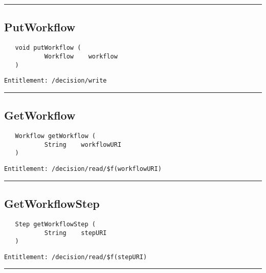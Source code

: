 \rule{12cm}{2pt}
\subsection{PutWorkflow}
\label{Api:PutWorkflow}
\begin{Verbatim}
   void putWorkflow (
           Workflow    workflow
   )
\end{Verbatim}
\begin{Verbatim}[formatcom=\color{Maroon}]
  Entitlement: /decision/write
\end{Verbatim}



\rule{12cm}{2pt}
\subsection{GetWorkflow}
\label{Api:GetWorkflow}
\begin{Verbatim}
   Workflow getWorkflow (
           String    workflowURI
   )
\end{Verbatim}
\begin{Verbatim}[formatcom=\color{Maroon}]
  Entitlement: /decision/read/$f(workflowURI)
\end{Verbatim}



\rule{12cm}{2pt}
\subsection{GetWorkflowStep}
\label{Api:GetWorkflowStep}
\begin{Verbatim}
   Step getWorkflowStep (
           String    stepURI
   )
\end{Verbatim}
\begin{Verbatim}[formatcom=\color{Maroon}]
  Entitlement: /decision/read/$f(stepURI)
\end{Verbatim}



\rule{12cm}{2pt}
